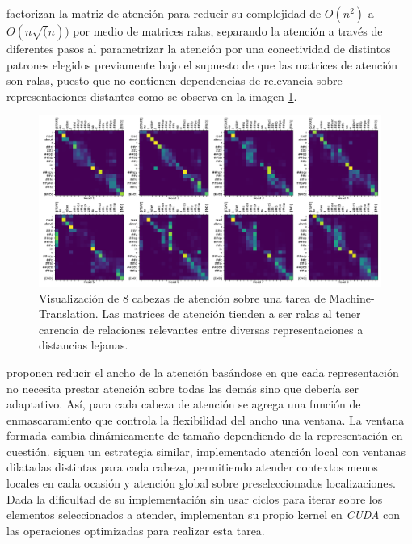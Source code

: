 \citeauthor{DBLP:journals/corr/abs-1904-10509} factorizan la matriz de atención para reducir su complejidad
de $O(n^2)$ a $O(n\sqrt(n))$ por medio de matrices ralas, separando la atención a través de diferentes
pasos al parametrizar la atención por una conectividad de distintos patrones elegidos previamente bajo el supuesto
de que las matrices de atención son ralas, puesto que no contienen dependencias de relevancia
sobre representaciones distantes como se observa en la imagen \ref{fig:att-spar}.

\begin{figure}[ht!]
    \centering
    \includegraphics[width=0.7 \textwidth]{Chapters/2. Transformer/Figures/transformer/head_sparsity.png}
    \caption{Visualización de 8 cabezas de atención sobre una tarea de Machine-Translation. Las
    matrices de atención tienden a ser ralas al tener carencia de relaciones relevantes entre diversas
    representaciones a distancias lejanas.}
    \label{fig:att-spar}
\end{figure}

\citeauthor{DBLP:journals/corr/abs-1905-07799} proponen reducir el ancho de la atención basándose en
que cada representación no necesita prestar atención sobre todas las demás sino que debería ser
adaptativo. Así, para cada cabeza de atención se agrega una función de enmascaramiento que controla
la flexibilidad del ancho una ventana. La ventana formada cambia dinámicamente de tamaño
dependiendo de la representación en cuestión.
\citeauthor{DBLP:journals/corr/abs-2004-05150} siguen un estrategia similar, implementado
atención local con ventanas dilatadas distintas para cada cabeza, permitiendo atender contextos menos
locales en cada ocasión y atención global sobre preseleccionados localizaciones. Dada la dificultad de
su implementación sin usar ciclos para iterar sobre los elementos seleccionados a atender, implementan
su propio kernel en \textit{CUDA} con las operaciones optimizadas para realizar esta tarea.

